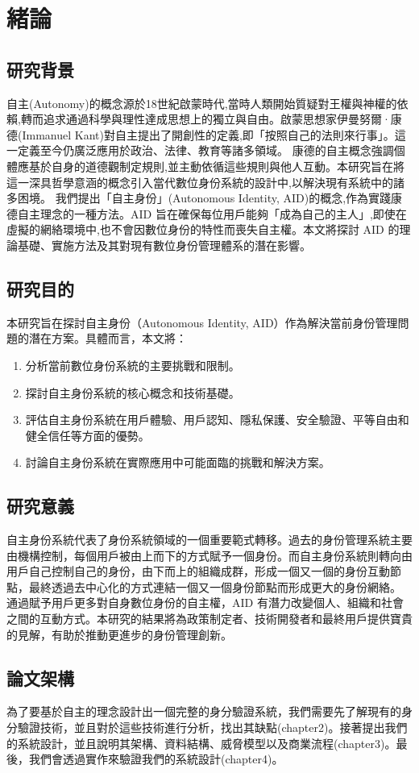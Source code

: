
\chapter{緒論}
\section{研究背景}
自主(Autonomy)的概念源於18世紀啟蒙時代,當時人類開始質疑對王權與神權的依賴,轉而追求通過科學與理性達成思想上的獨立與自由。啟蒙思想家伊曼努爾·康德(Immanuel Kant)對自主提出了開創性的定義,即「按照自己的法則來行事」。這一定義至今仍廣泛應用於政治、法律、教育等諸多領域。
康德的自主概念強調個體應基於自身的道德觀制定規則,並主動依循這些規則與他人互動。本研究旨在將這一深具哲學意涵的概念引入當代數位身份系統的設計中,以解決現有系統中的諸多困境。
我們提出「自主身份」(Autonomous Identity, AID)的概念,作為實踐康德自主理念的一種方法。AID 旨在確保每位用戶能夠「成為自己的主人」,即使在虛擬的網絡環境中,也不會因數位身份的特性而喪失自主權。本文將探討 AID 的理論基礎、實施方法及其對現有數位身份管理體系的潛在影響。
\section{研究目的}
本研究旨在探討自主身份（Autonomous Identity, AID）作為解決當前身份管理問題的潛在方案。具體而言，本文將：
\begin{enumerate}
  \item 分析當前數位身份系統的主要挑戰和限制。
  \item 探討自主身份系統的核心概念和技術基礎。
  \item 評估自主身份系統在用戶體驗、用戶認知、隱私保護、安全驗證、平等自由和健全信任等方面的優勢。
  \item 討論自主身份系統在實際應用中可能面臨的挑戰和解決方案。
\end{enumerate}
\section{研究意義}
自主身份系統代表了身份系統領域的一個重要範式轉移。過去的身份管理系統主要由機構控制，每個用戶被由上而下的方式賦予一個身份。而自主身份系統則轉向由用戶自己控制自己的身份，由下而上的組織成群，形成一個又一個的身份互動節點，最終透過去中心化的方式連結一個又一個身份節點而形成更大的身份網絡。
通過賦予用戶更多對自身數位身份的自主權，AID 有潛力改變個人、組織和社會之間的互動方式。本研究的結果將為政策制定者、技術開發者和最終用戶提供寶貴的見解，有助於推動更進步的身份管理創新。
\section{論文架構}
為了要基於自主的理念設計出一個完整的身分驗證系統，我們需要先了解現有的身分驗證技術，並且對於這些技術進行分析，找出其缺點(chapter2)。接著提出我們的系統設計，並且說明其架構、資料結構、威脅模型以及商業流程(chapter3)。最後，我們會透過實作來驗證我們的系統設計(chapter4)。\newpage